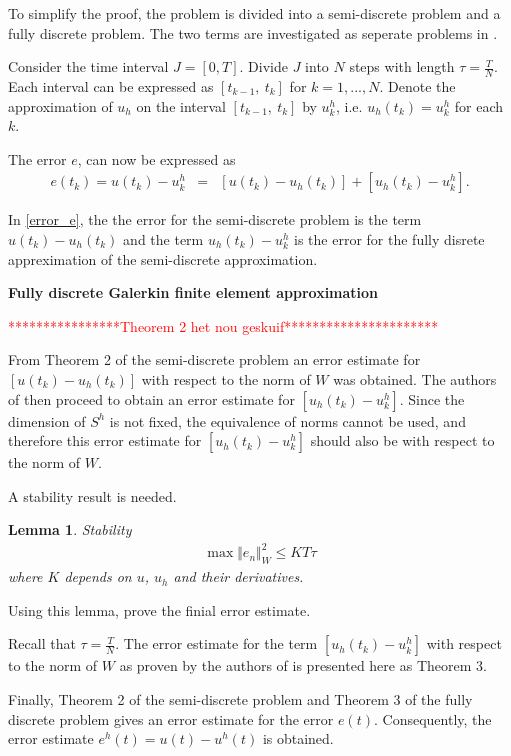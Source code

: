 \documentclass[../../main.tex]{subfiles}
\begin{document}
To simplify the proof, the problem is divided into a semi-discrete problem and a fully discrete problem. The two terms are investigated as seperate problems
in \cite{BV13}.

Consider the time interval $J = [0,T]$. Divide $J$ into $N$ steps with length $\tau = \frac{T}{N}$. Each interval can be expressed as $[t_{k-1}, \ t_k]$ for $k = 1,...,N$. Denote the approximation of $u_h$ on the interval $[t_{k-1}, \ t_k]$ by $u_k^h$, i.e. $u_h(t_k) = u_k^h$ for each $k$.

The error $e$, can now be expressed as
\begin{eqnarray}
	e(t_k) = u(t_k) - u^h_k & = & [u(t_k)-u_h(t_k)] + [u_h(t_k) - u^h_k]. \label{error_e}
\end{eqnarray}

In \eqref{error_e}, the the error for the semi-discrete problem is the term $u(t_k)-u_h(t_k)$ and the term $u_h(t_k) - u^h_k$ is the error for the fully disrete appreximation of the semi-discrete approximation.


\textbf{Fully discrete Galerkin finite element approximation}

\textcolor{red}{****************Theorem 2 het nou geskuif**********************}


From Theorem 2 of the semi-discrete problem an error estimate for
$[u(t_k)-u_h(t_k)]$ with respect to the norm of $W$ was obtained. The authors
of \cite{BV13} then proceed to obtain an error estimate for $[u_h(t_k) -
			u^h_k]$. Since the dimension of $S^h$ is not fixed, the equivalence of norms
cannot be used, and therefore this error estimate for $[u_h(t_k) - u^h_k]$
should also be with respect to the norm of $W$.

A stability result is needed.

\newtheorem*{DC_Lem3}{Lemma}
\begin{DC_Lem3}
	Stability
	\begin{eqnarray*}
		\max\Vert e_{n}\Vert_{W}^{2}\leq KT\tau
	\end{eqnarray*}
	where $K$ depends on $u$, $u_h$ and their derivatives.
\end{DC_Lem3}


Using this lemma, \cite{BV13} prove the finial error estimate.

Recall that $\displaystyle \tau = \frac{T}{N}$. The error estimate for the term
$[u_h(t_k) - u^h_k]$ with respect to the norm of $W$ as proven by the authors
of \cite{BV13} is presented here as Theorem 3.

Finally, Theorem 2 of the semi-discrete problem and Theorem 3 of the fully
discrete problem gives an error estimate for the error $e(t)$. Consequently,
the error estimate $e^h(t) = u(t) - u^h(t)$ is obtained.
\end{document}
